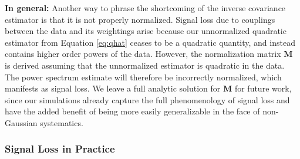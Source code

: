 \documentclass[preprint2,numberedappendix,tighten]{aastex6}  %
\newcommand{\dcj}[1]{{\color{orange} \textbf{[DCJ: #1]}}}
\begin{document}


{\bf In general:} Another way to phrase the shortcoming of the inverse covariance estimator is that it is not properly normalized. Signal loss due to couplings between the data and its weightings arise because our unnormalized quadratic estimator from Equation \eqref{eq:qhat} ceases to be a quadratic quantity, and instead contains higher order powers of the data. However, the normalization matrix $\mathbf{M}$ is derived assuming that the unnormalized estimator is quadratic in the data. The power spectrum estimate will therefore be incorrectly normalized, which manifests as signal loss. We leave a full analytic solution for $\mathbf{M}$ for future work, since our simulations already capture the full phenomenology of signal loss and have the added benefit of being more easily generalizable in the face of non-Gaussian systematics.

\subsubsection{Signal Loss in Practice}
\label{sec:Practice}
\end{document}
